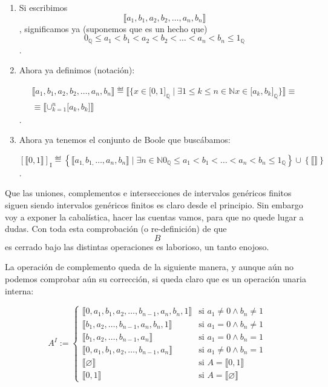 \begin{enumerate}
\begin{enumerate}
      \[⟦{a_{1},b_{1},a_{2},b_{2},\ldots,a_{n},b_{n}}⟧\]definirán los
      elementos de
      \[\mathbf{\mathrm{I}}_{\mathbb{Q}}^{\mathbf{\mathrm{GEN}}}\],
      aparte de
      \[{⟦⟧} ≝ {{{{⟦\varnothing ⟧} = {⟦{\{ 0\}}⟧}} = {⟦{\{ 1\}}⟧}} = 0_{\mathbf{\mathrm{I}}_{B}^{\mathbf{\mathrm{GEN}}}}}\].
    \item
      Si escribimos \[⟦{a_{1},b_{1},a_{2},b_{2},\ldots,a_{n},b_{n}}⟧\],
      significamos ya (suponemos que es un hecho que)
      \[{{{{{{{0_{\mathbb{Q}} \leq a_{1}} < b_{1}} < a_{2}} < b_{2}} < \ldots} < a_{n}} < b_{n}} \leq 1_{\mathbb{Q}}\].
    \item
      Ahora ya definimos (notación):

      \[\begin{matrix}
      {{⟦{a_{1},b_{1},a_{2},b_{2},\ldots,a_{n},b_{n}}⟧} ≝ {{⟦{\{{{x \in {\lbrack 0,1\rbrack}_{\mathbb{Q}}} \mid \exists{{{1 \leq k} \leq n} \in \mathbb{N}}{x \in {\lbrack{a_{k},b_{k}}\rbrack}_{\mathbb{Q}}}}\}}⟧} \equiv}} \\
      {\equiv {⟦{\mathbf{\cup}_{k = 1}^{n}{\lbrack{a_{k},b_{k}}\rbrack}}⟧}}
      \end{matrix}\].
    \item
      Ahora ya tenemos el conjunto de Boole que buscábamos:

      \[\left\lbrack {⟦0,1⟧} \right\rbrack_{\mathbf{\mathrm{I}}} ≝ {\left\{ {{⟦{a_{1,}b_{1,}\ldots,a_{n},b_{n}}⟧} \mid {\exists{n \in \mathbb{N}}{{{{{{0_{\mathbb{Q}} \leq a_{1}} < b_{1}} < \ldots} < a_{n}} < b_{n}} \leq 1_{\mathbb{Q}}}}} \right\} \cup \left\{ {⟦⟧} \right\}}\].
    \end{enumerate}
  \end{enumerate}

  Que las uniones, complementos e intersecciones de intervalos genéricos
  finitos siguen siendo intervalos genéricos finitos es claro desde el
  principio. Sin embargo voy a exponer la cabalística, hacer las cuentas
  vamos, para que no quede lugar a dudas. Con toda esta comprobación (o
  re-definición) de que \[B\] es cerrado bajo las distintas operaciones
  es laborioso, un tanto enojoso.

  La operación de complemento queda de la siguiente manera, y aunque aún
  no podemos comprobar aún su corrección, si queda claro que es un
  operación unaria interna:

  \[
A^{I} := \begin{cases}
  \llbracket 0, a_1, b_1, a_2, \ldots, b_{n-1}, a_n, b_n, 1 \rrbracket & \text{si } a_1 \neq 0 \land b_n \neq 1 \\
  \llbracket b_1, a_2, \ldots, b_{n-1}, a_n, b_n, 1 \rrbracket & \text{si } a_1 = 0 \land b_n \neq 1 \\
  \llbracket b_1, a_2, \ldots, b_{n-1}, a_n \rrbracket & \text{si } a_1 = 0 \land b_n = 1 \\
  \llbracket 0, a_1, b_1, a_2, \ldots, b_{n-1}, a_n \rrbracket & \text{si } a_1 \neq 0 \land b_n = 1 \\
  \llbracket \varnothing \rrbracket & \text{si } A = \llbracket 0, 1 \rrbracket \\
  \llbracket 0, 1 \rrbracket & \text{si } A = \llbracket \varnothing \rrbracket
\end{cases}
\]

